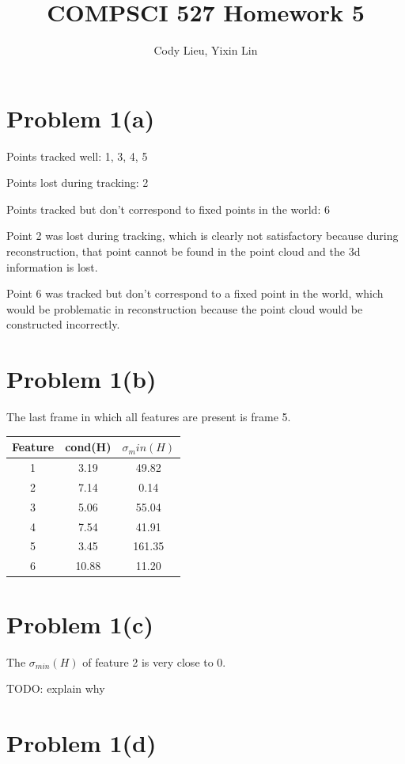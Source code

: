 \documentclass{article}
\author{Cody Lieu, Yixin Lin}
\title{COMPSCI 527 Homework 5}
\begin{document}
\maketitle

\section*{Problem 1(a)}

Points tracked well: 1, 3, 4, 5

Points lost during tracking: 2

Points tracked but don't correspond to fixed points in the world: 6

Point 2 was lost during tracking, which is clearly not satisfactory because during reconstruction, that point cannot be found in the point cloud and the 3d information is lost.

Point 6 was tracked but don't correspond to a fixed point in the world, which would be problematic in reconstruction because the point cloud would be constructed incorrectly.

\section*{Problem 1(b)}

The last frame in which all features are present is frame 5.

\begin{center}
\begin{tabular}{ ||c|c|c|| } 
	\hline
	Feature & cond(H) & $\sigma_min(H)$ \\ \hline
 	1 &3.19 &49.82 \\ 
	2 &7.14 &0.14 \\
	3 &5.06 &55.04 \\
	4 &7.54 &41.91 \\
	5 &3.45 &161.35 \\
	6 &10.88 &11.20 \\
\hline
\end{tabular}
\end{center}

\section*{Problem 1(c)}
The $\sigma_{min}(H)$ of feature 2 is very close to 0.

TODO: explain why

\section*{Problem 1(d)}
\end{document}
